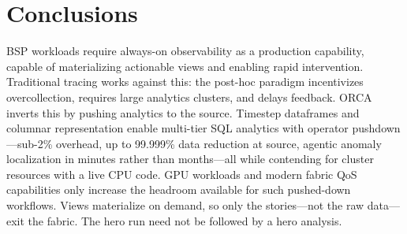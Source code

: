 
\section{Conclusions}






BSP workloads require always-on observability as a production capability, capable of materializing
actionable views and enabling rapid intervention.
Traditional tracing works against this: the post-hoc paradigm incentivizes overcollection, requires
large analytics clusters, and delays feedback.
ORCA inverts this by pushing analytics to the source.
Timestep dataframes and columnar representation enable multi-tier SQL analytics with operator
pushdown---sub-2\% overhead, up to 99.999\% data reduction at source, agentic anomaly localization
in minutes rather than months---all while contending for cluster resources with a live CPU
code.
GPU workloads and modern fabric QoS capabilities only increase the headroom available for such
pushed-down workflows.
Views materialize on demand, so only the stories---not the raw data---exit the fabric.
The hero run need not be followed by a hero analysis.

